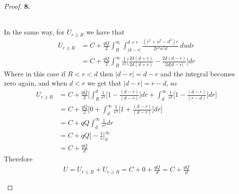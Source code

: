 \documentclass[11pt]{article}
\theoremstyle{definition}
\begin{document}
\begin{proof}{\textbf{8.}}
\begin{itemize}
\\
In the same way, for $U_{r \geq R}$ we have that
\begin{align*}
    U_{r \geq R}
    &= C + \frac{qQ}{2} \int_R^\infty
    \int_{|d - r|}^{d + r}
    \frac{(r^2 + u^2 - d^2)r}{2r^3u^2d}
    ~ dudr\\
    &= C + \frac{qQ}{2} \int_R^\infty
    \frac{1}{r^2}\bigg[\frac{2d(d + r)}{2d(d + r)}
    - \frac{2d(d - r)}{2d|d - r|}
    \bigg] dr
\end{align*}
Where in this case if $R < r < d$ then $|d - r| = d - r$ and the integral
becomes zero again, and when $d < r$ we get that $|d - r| = r - d$, so
\begin{align*}
    U_{r \geq R}
    &= C + \frac{qQ}{2} \bigg[\int_R^d
    \frac{1}{r^2}\bigg[1 - \frac{(d - r)}{(d - r)} \bigg] dr
    + \int_d^\infty
    \frac{1}{r^2}\bigg[1 - \frac{(d - r)}{(r - d)} \bigg] dr\bigg]\\
    &= C + \frac{qQ}{2} \bigg[0 + \int_d^\infty
    \frac{1}{r^2}\bigg[1 + \frac{(d - r)}{(d - r)} \bigg] dr\bigg]\\
    &= C + qQ \int_d^\infty \frac{1}{r^2} dr\\
    &= C + qQ \bigg[-\frac{1}{r}\bigg]_{d}^\infty\\
    &= C + \frac{qQ}{d}
\end{align*}
Therefore
\begin{align*}
    U = U_{r \leq R} + U_{r \geq R} = C + 0 + \frac{qQ}{d} = C + \frac{qQ}{d}
\end{align*}
\end{itemize}
\end{proof}
\end{document}
